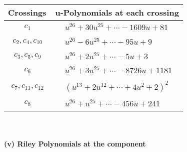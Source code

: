 \documentclass[1p]{elsarticle_modified}
\theoremstyle{definition}
\begin{document}
\begin{tabular}{m{50pt}|m{274pt}}
Crossings & \hspace{64pt}u-Polynomials at each crossing \\
\hline $$\begin{aligned}c_{1}\end{aligned}$$&$\begin{aligned}
&u^{26}+30 u^{25}+\cdots-1609 u+81
\end{aligned}$\\
\hline $$\begin{aligned}c_{2},c_{4},c_{10}\end{aligned}$$&$\begin{aligned}
&u^{26}-6 u^{25}+\cdots-95 u+9
\end{aligned}$\\
\hline $$\begin{aligned}c_{3},c_{5},c_{9}\end{aligned}$$&$\begin{aligned}
&u^{26}+2 u^{25}+\cdots-5 u+3
\end{aligned}$\\
\hline $$\begin{aligned}c_{6}\end{aligned}$$&$\begin{aligned}
&u^{26}+3 u^{25}+\cdots-8726 u+1181
\end{aligned}$\\
\hline $$\begin{aligned}c_{7},c_{11},c_{12}\end{aligned}$$&$\begin{aligned}
&(u^{13}+2 u^{12}+\cdots+4 u^2+2)^{2}
\end{aligned}$\\
\hline $$\begin{aligned}c_{8}\end{aligned}$$&$\begin{aligned}
&u^{26}+u^{25}+\cdots-456 u+241
\end{aligned}$\\
\hline
\end{tabular}\\~\\
\newpage\renewcommand{\arraystretch}{1}
\flushleft \textbf{(v) Riley Polynomials at the component}\newline \\
\end{document}
